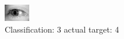 \begin{figure}[h!]
\begin{center}
\includegraphics[width=0.60\columnwidth]{figures/ID3244_class_3_target_4.png}
\end{center}
\caption{ Classification: 3 actual target: 4}
\label{fig:ID3244_class_3_target_4}
\end{figure}
